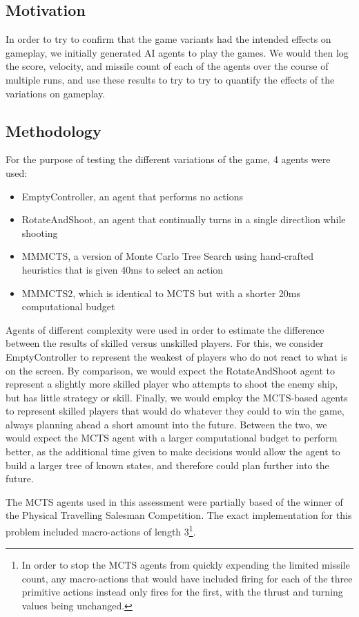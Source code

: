 \subsection{Motivation}

In order to try to confirm that the game variants had the intended effects on gameplay, we initially generated AI agents to play the games. We would then log the score, velocity, and missile count of each of the agents over the course of multiple runs, and use these results to try to try to quantify the effects of the variations on gameplay.

\subsection{Methodology}

For the purpose of testing the different variations of the game, 4 agents were used:
\begin{itemize}
	\item EmptyController, an agent that performs no actions
	\item RotateAndShoot, an agent that continually turns in a single directlion while shooting
	\item MMMCTS, a version of Monte Carlo Tree Search using hand-crafted heuristics that is given 40ms to select an action
	\item MMMCTS2, which is identical to MCTS but with a shorter 20ms computational budget
\end{itemize}

Agents of different complexity were used in order to estimate the difference between the results of skilled versus unskilled players. For this, we consider EmptyController to represent the weakest of players who do not react to what is on the screen. By comparison, we would expect the RotateAndShoot agent to represent a slightly more skilled player who attempts to shoot the enemy ship, but has little strategy or skill. Finally, we would employ the MCTS-based agents to represent skilled players that would do whatever they could to win the game, always planning ahead a short amount into the future. Between the two, we would expect the MCTS agent with a larger computational budget to perform better, as the additional time given to make decisions would allow the agent to build a larger tree of known states, and therefore could plan further into the future.

The MCTS agents used in this assessment were partially based of the winner of the Physical Travelling Salesman Competition\cite{6374161}. The exact implementation for this problem included macro-actions of length 3\footnote{In order to stop the MCTS agents from quickly expending the limited missile count, any macro-actions that would have included firing for each of the three primitive actions instead only fires for the first, with the thrust and turning values being unchanged.}. 


